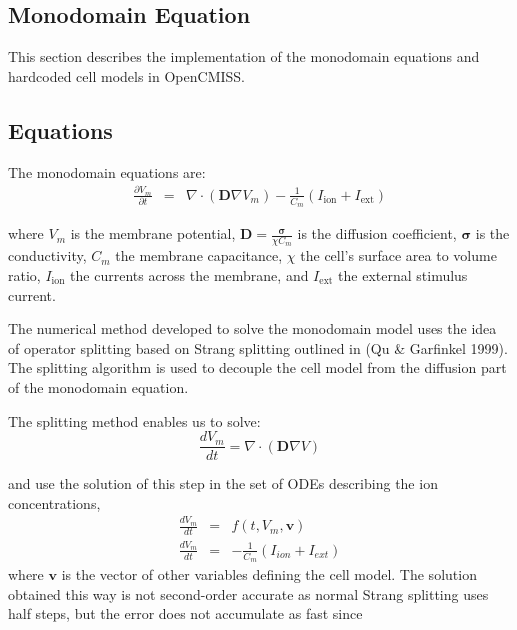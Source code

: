 
\subsection{Monodomain Equation}
 

\renewcommand{\vec}[1]{\boldsymbol{#1}}
\newcommand{\Iion}{I_{\text{ion}}}
\newcommand{\Iext}{I_{\text{ext}}}
\newcommand{\pd}[2]{\frac{\partial #1}{\partial #2}}
\newcommand{\lrbr}[1]{\left(#1\right)}
\newcommand{\dt}{\Delta t}



This section describes the implementation of the monodomain equations and hardcoded cell models in OpenCMISS.

\subsection{Equations}
The monodomain equations are:
\begin{eqnarray}
 \pd{V_m}{t}  &=&  \nabla \cdot \lrbr{\vec{D} \nabla V_m}  -  \frac{1}{C_m}\lrbr{\Iion + \Iext}
\end{eqnarray}

where $V_m$ is the membrane potential, $\vec{D}=\frac{\vec{\sigma}}{\chi C_m}$ is the diffusion coefficient, $\vec{\sigma}$ is the conductivity, $C_m$ the membrane capacitance, $\chi$ the cell's surface area to volume ratio, $\Iion$ the currents across the membrane, and $\Iext$ the external stimulus current.

The numerical method developed to solve the monodomain model uses the idea of operator splitting based on Strang splitting outlined in (Qu \& Garfinkel 1999). The splitting algorithm is used to decouple the cell model from the diffusion part of the monodomain equation. 

The splitting method enables us to solve:
\begin{equation}
\frac{d V_m}{d t} = \nabla \cdot (\mathbf{D}\nabla V)
\label{diff}
\end{equation}

and use the solution of this step in the set of ODEs describing the ion concentrations,
\begin{eqnarray}
\frac{d V_m}{d t} &=& f(t,V_m,\vec{v})\\
\frac{d V_m}{d t} &=&  - \frac{1}{C_m}(I_{ion} + I_{ext})
\end{eqnarray}
where $\vec{v}$ is the vector of other variables defining the cell model.
The solution obtained this way is not second-order accurate as normal Strang splitting uses half steps, but the error does not accumulate as
fast since

